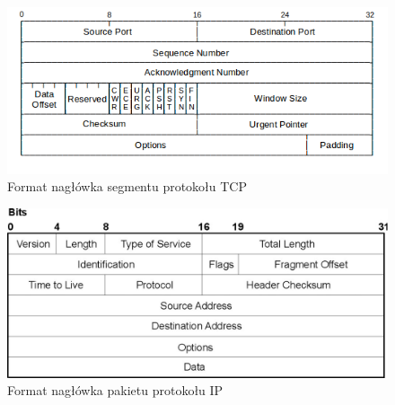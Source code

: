 \documentclass[a4paper, twoside, openright, 12pt]{report}
\begin{document}
        \begin{figure}[h]
                \centering
                \includegraphics[scale=0.6]{tcp_header}
                \caption{Format nagłówka segmentu protokołu TCP}
                \label{TCPHEADER}
        \end{figure}
        \begin{figure}[h]
                \centering
                \includegraphics[scale=0.6]{ip_header}
                \caption{Format nagłówka pakietu protokołu IP}
                \label{IPHEADER}
        \end{figure}
\end{document}
